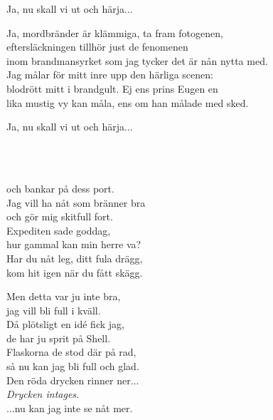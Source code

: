 {{Ja, nu skall vi ut och härja...

Ja, mordbränder är klämmiga, ta fram fotogenen,\\
eftersläckningen tillhör just de fenomenen\\
inom brandmansyrket som jag tycker det är nån nytta med.\\
Jag målar för mitt inre upp den härliga scenen:\\
blodrött mitt i brandgult. Ej ens prins Eugen en\\
lika mustig vy kan måla, ens om han målade med sked. 

Ja, nu skall vi ut och härja...


\newpage 

 \\       

\\
och bankar på dess port.\\
Jag vill ha nåt som bränner bra\\
och gör mig skitfull fort.\\
Expediten sade goddag,\\
hur gammal kan min herre va?\\
Har du nåt leg, ditt fula drägg,\\
kom hit igen när du fått skägg.

Men detta var ju inte bra,\\
jag vill bli full i kväll.\\
Då plötsligt en idé fick jag,\\
de har ju sprit på Shell.\\
Flaskorna de stod där på rad,\\
så nu kan jag bli full och glad. \\
Den röda drycken rinner ner...\\
\textit{Drycken intages.}\\
...nu kan jag inte se nåt mer.

\newpage

 \\       
\author{Text: D-LTH, Sångarstriden 1987}

}}
